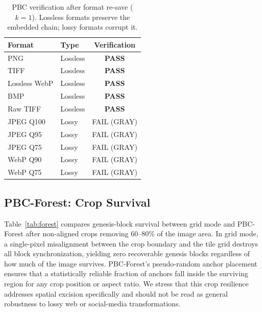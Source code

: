 \documentclass[conference]{IEEEtran}
\begin{document}
\begin{table}[t]
  \centering
  \caption{PBC verification after format re-save ($k{=}1$). Lossless
    formats preserve the embedded chain; lossy formats corrupt it.}
  \label{tab:format}
  \begin{tabular}{llc}
    \toprule
    Format           & Type     & Verification \\
    \midrule
    PNG              & Lossless & \textbf{PASS} \\
    TIFF             & Lossless & \textbf{PASS} \\
    Lossless WebP    & Lossless & \textbf{PASS} \\
    BMP              & Lossless & \textbf{PASS} \\
    Raw TIFF         & Lossless & \textbf{PASS} \\
    \midrule
    JPEG Q100        & Lossy    & FAIL (GRAY)  \\
    JPEG Q95         & Lossy    & FAIL (GRAY)  \\
    JPEG Q75         & Lossy    & FAIL (GRAY)  \\
    WebP Q90         & Lossy    & FAIL (GRAY)  \\
    WebP Q75         & Lossy    & FAIL (GRAY)  \\
    \bottomrule
  \end{tabular}
\end{table}

\subsection{PBC-Forest: Crop Survival}

Table~\ref{tab:forest} compares genesis-block survival between grid
mode and PBC-Forest after non-aligned crops removing $60$--$80\%$ of
the image area. In grid mode, a single-pixel misalignment between the
crop boundary and the tile grid destroys all block synchronization,
yielding zero recoverable genesis blocks regardless of how much of the
image survives. PBC-Forest's pseudo-random anchor placement ensures
that a statistically reliable fraction of anchors fall inside the
surviving region for any crop position or aspect ratio. We stress that this crop resilience addresses spatial excision specifically and should not be read as general robustness to lossy web or social-media transformations.
\end{document}
